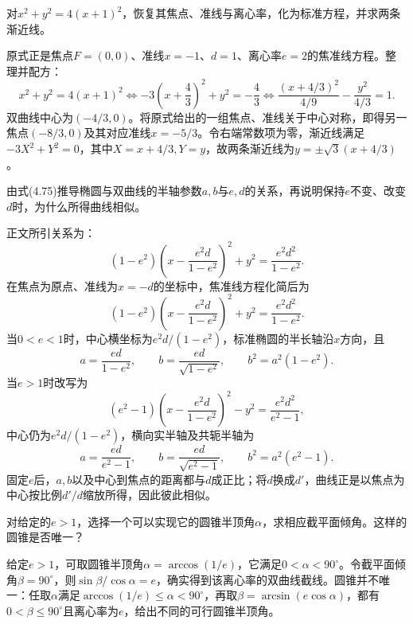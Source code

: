 对\(x^2+y^2=4(x+1)^2\)，恢复其焦点、准线与离心率，化为标准方程，并求两条渐近线。
\par
\solutionanswer
原式正是焦点\(F=(0,0)\)、准线\(x=-1\)、\(d=1\)、离心率\(e=2\)的焦准线方程。整理并配方：
\[
x^2+y^2=4(x+1)^2
\iff -3\left(x+\frac43\right)^2+y^2=-\frac43
\iff \frac{(x+4/3)^2}{4/9}-\frac{y^2}{4/3}=1.
\]
双曲线中心为\((-4/3,0)\)。将原式给出的一组焦点、准线关于中心对称，即得另一焦点\((-8/3,0)\)及其对应准线\(x=-5/3\)。令右端常数项为零，渐近线满足\(-3X^2+Y^2=0\)，其中\(X=x+4/3,Y=y\)，故两条渐近线为\(y=\pm\sqrt3(x+4/3)\)。


由式\textup{(4.75)}推导椭圆与双曲线的半轴参数\(a,b\)与\(e,d\)的关系，再说明保持\(e\)不变、改变\(d\)时，为什么所得曲线相似。
\par

\par\smallskip\noindent 正文所引关系为：
\begin{equation*}
(1-e^2)\left(x-\frac{e^2d}{1-e^2}\right)^2+y^2
    =\frac{e^2d^2}{1-e^2} .
\end{equation*}
\solutionanswer
在焦点为原点、准线为\(x=-d\)的坐标中，焦准线方程化简后为
\[
(1-e^2)\left(x-\frac{e^2d}{1-e^2}\right)^2+y^2=\frac{e^2d^2}{1-e^2}.
\]
当\(0<e<1\)时，中心横坐标为\(e^2d/(1-e^2)\)，标准椭圆的半长轴沿\(x\)方向，且
\[
a=\frac{ed}{1-e^2},\qquad b=\frac{ed}{\sqrt{1-e^2}},\qquad b^2=a^2(1-e^2).
\]
当\(e>1\)时改写为
\[
(e^2-1)\left(x-\frac{e^2d}{1-e^2}\right)^2-y^2=\frac{e^2d^2}{e^2-1},
\]
中心仍为\(e^2d/(1-e^2)\)，横向实半轴及共轭半轴为
\[
a=\frac{ed}{e^2-1},\qquad b=\frac{ed}{\sqrt{e^2-1}},\qquad b^2=a^2(e^2-1).
\]
固定\(e\)后，\(a,b\)以及中心到焦点的距离都与\(d\)成正比；将\(d\)换成\(d'\)，曲线正是以焦点为中心按比例\(d'/d\)缩放所得，因此彼此相似。


对给定的\(e>1\)，选择一个可以实现它的圆锥半顶角\(\alpha\)，求相应截平面倾角。这样的圆锥是否唯一？
\par
\solutionanswer
给定\(e>1\)，可取圆锥半顶角\(\alpha=\arccos(1/e)\)，它满足\(0<\alpha<90^\circ\)。令截平面倾角\(\beta=90^\circ\)，则\(\sin\beta/\cos\alpha=e\)，确实得到该离心率的双曲线截线。圆锥并不唯一：任取\(\alpha\)满足\(\arccos(1/e)\le\alpha<90^\circ\)，再取\(\beta=\arcsin(e\cos\alpha)\)，都有\(0<\beta\le90^\circ\)且离心率为\(e\)，给出不同的可行圆锥半顶角。


